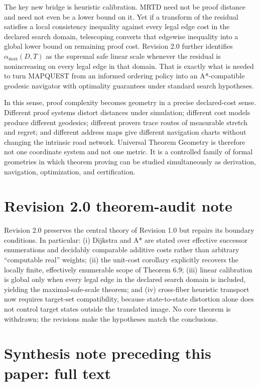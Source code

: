 \documentclass[11pt]{article}
\theoremstyle{definition}
\theoremstyle{remark}
\begin{document}
The key new bridge is heuristic calibration. MRTD need not be proof distance and need not even be a lower bound on it. Yet if a transform of the residual satisfies a local consistency inequality against every legal edge cost in the declared search domain, telescoping converts that edgewise inequality into a global lower bound on remaining proof cost. Revision 2.0 further identifies $\alpha_{\max}(D,T)$ as the supremal safe linear scale whenever the residual is nonincreasing on every legal edge in that domain. That is exactly what is needed to turn MAPQUEST from an informed ordering policy into an A*-compatible geodesic navigator with optimality guarantees under standard search hypotheses.

In this sense, proof complexity becomes geometry in a precise declared-cost sense. Different proof systems distort distances under simulation; different cost models produce different geodesics; different provers trace routes of measurable stretch and regret; and different address maps give different navigation charts without changing the intrinsic road network. Universal Theorem Geometry is therefore not one coordinate system and not one metric. It is a controlled family of formal geometries in which theorem proving can be studied simultaneously as derivation, navigation, optimization, and certification.

\section*{Revision 2.0 theorem-audit note}
Revision 2.0 preserves the central theory of Revision 1.0 but repairs its boundary conditions. In particular: (i) Dijkstra and A* are stated over effective successor enumerations and decidably comparable additive costs rather than arbitrary ``computable real'' weights; (ii) the unit-cost corollary explicitly recovers the locally finite, effectively enumerable scope of Theorem 6.9; (iii) linear calibration is global only when every legal edge in the declared search domain is included, yielding the maximal-safe-scale theorem; and (iv) cross-fiber heuristic transport now requires target-set compatibility, because state-to-state distortion alone does not control target states outside the translated image. No core theorem is withdrawn; the revisions make the hypotheses match the conclusions.

\appendix
\section{Synthesis note preceding this paper: full text}
\end{document}
